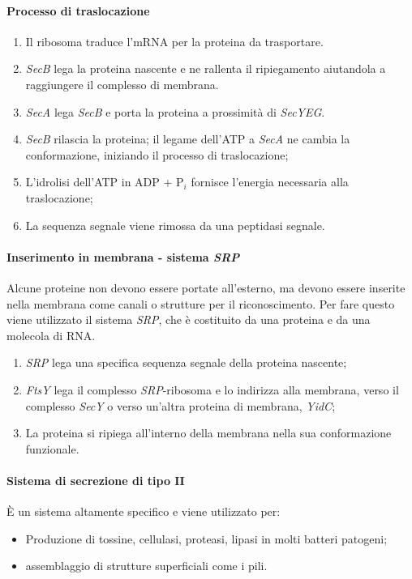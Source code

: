 			\paragraph{Processo di traslocazione}
			\begin{multicols}{2}
				\begin{enumerate}
	    				\item Il ribosoma traduce l'mRNA per la proteina da trasportare.
					\item \emph{SecB} lega la proteina nascente e ne rallenta il ripiegamento aiutandola a raggiungere il complesso di membrana.
					\item \emph{SecA} lega \emph{SecB} e porta la proteina a prossimit\`a di \emph{SecYEG}.
					\item \emph{SecB} rilascia la proteina; il legame dell'ATP a \emph{SecA} ne cambia la conformazione, iniziando il processo di traslocazione; 
	    				\item L'idrolisi dell'ATP in ADP + P$_i$ fornisce l'energia necessaria alla traslocazione;
	    				\item La sequenza segnale viene rimossa da una peptidasi segnale.
				\end{enumerate}
			\end{multicols}
			
			\paragraph{Inserimento in membrana - sistema \emph{SRP}}
			Alcune proteine non devono essere portate all'esterno, ma devono essere inserite nella membrana come canali o strutture per il riconoscimento. 
			Per fare questo viene utilizzato il sistema \emph{SRP}, che \`e costituito da una proteina e da una molecola di RNA.
			\begin{enumerate}
				\item \emph{SRP} lega una specifica sequenza segnale della proteina nascente; 
				\item \emph{FtsY} lega il complesso \emph{SRP}-ribosoma e lo indirizza alla membrana, verso il complesso \emph{SecY} o verso un'altra proteina di membrana, \emph{YidC};
	    			\item La proteina si ripiega all'interno della membrana nella sua conformazione funzionale.
			\end{enumerate}
	
			\paragraph{Sistema di secrezione di tipo $\mathbf{II}$}
			\`E un sistema altamente specifico e viene utilizzato per: 
			\begin{multicols}{2}
				\begin{itemize}
	    				\item Produzione di tossine, cellulasi, proteasi, lipasi in molti batteri patogeni; 
	    				\item assemblaggio di strutture superficiali come i pili.
				\end{itemize}
			\end{multicols}

